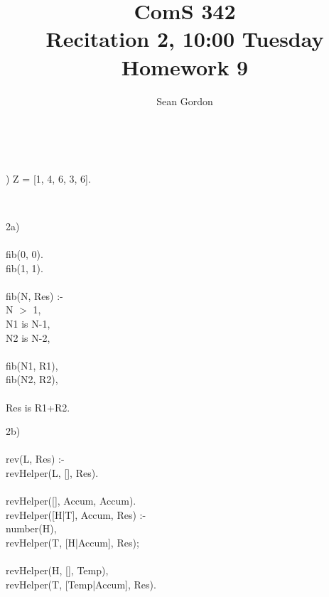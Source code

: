 \documentclass[12pt]{article}
\title{ComS 342\\Recitation 2, 10:00 Tuesday\\Homework 9}
\author{Sean Gordon}
\begin{document}
\maketitle


\hrulefill \\


\begin{center}
) Z = [1, 4, 6, 3, 6].
\end{center}


\hrulefill \\


\begin{multicols}{2}

\noindent 2a)\\\\
fib(0, 0).\\
fib(1, 1).\\\\
fib(N, Res) :-\\
\indent N $>$ 1,\\
\indent N1 is N-1,\\
\indent N2 is N-2,\\\\
\indent fib(N1, R1),\\
\indent fib(N2, R2),\\\\
\indent Res is R1+R2.\\

\columnbreak

\noindent 2b)\\\\
rev(L, Res) :-\\
\indent revHelper(L, [], Res).\\\\
revHelper([], Accum, Accum).\\
revHelper([H|T], Accum, Res) :-\\
\indent number(H),\\
\indent revHelper(T, [H|Accum], Res);\\\\
\indent revHelper(H, [], Temp),\\
\indent revHelper(T, [Temp|Accum], Res).\\

\end{multicols} 


\hrulefill \\
\pagebreak
\end{document}
